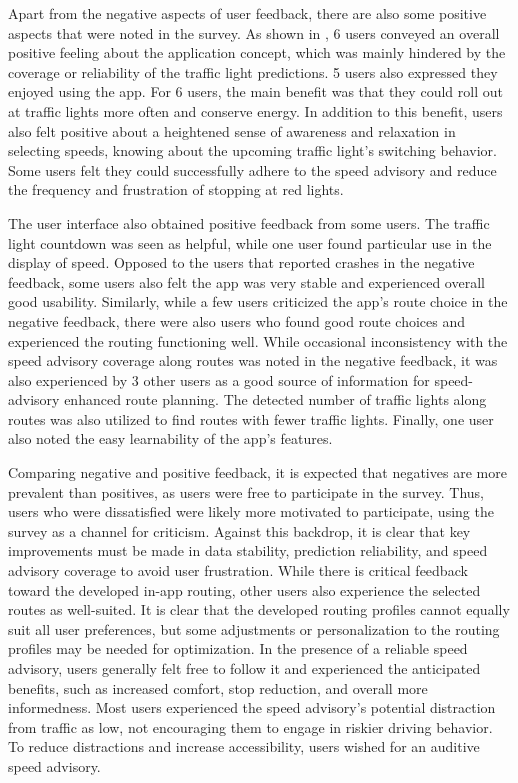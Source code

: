 Apart from the negative aspects of user feedback, there are also some positive aspects that were noted in the survey. As shown in , 6 users conveyed an overall positive feeling about the application concept, which was mainly hindered by the coverage or reliability of the traffic light predictions. 5 users also expressed they enjoyed using the app. For 6 users, the main benefit was that they could roll out at traffic lights more often and conserve energy. In addition to this benefit, users also felt positive about a heightened sense of awareness and relaxation in selecting speeds, knowing about the upcoming traffic light's switching behavior. Some users felt they could successfully adhere to the speed advisory and reduce the frequency and frustration of stopping at red lights.

The user interface also obtained positive feedback from some users. The traffic light countdown was seen as helpful, while one user found particular use in the display of speed. Opposed to the users that reported crashes in the negative feedback, some users also felt the app was very stable and experienced overall good usability. Similarly, while a few users criticized the app's route choice in the negative feedback, there were also users who found good route choices and experienced the routing functioning well. While occasional inconsistency with the speed advisory coverage along routes was noted in the negative feedback, it was also experienced by 3 other users as a good source of information for speed-advisory enhanced route planning. The detected number of traffic lights along routes was also utilized to find routes with fewer traffic lights. Finally, one user also noted the easy learnability of the app's features.

Comparing negative and positive feedback, it is expected that negatives are more prevalent than positives, as users were free to participate in the survey. Thus, users who were dissatisfied were likely more motivated to participate, using the survey as a channel for criticism. Against this backdrop, it is clear that key improvements must be made in data stability, prediction reliability, and speed advisory coverage to avoid user frustration. While there is critical feedback toward the developed in-app routing, other users also experience the selected routes as well-suited. It is clear that the developed routing profiles cannot equally suit all user preferences, but some adjustments or personalization to the routing profiles may be needed for optimization. In the presence of a reliable speed advisory, users generally felt free to follow it and experienced the anticipated benefits, such as increased comfort, stop reduction, and overall more informedness. Most users experienced the speed advisory's potential distraction from traffic as low, not encouraging them to engage in riskier driving behavior. To reduce distractions and increase accessibility, users wished for an auditive speed advisory.

